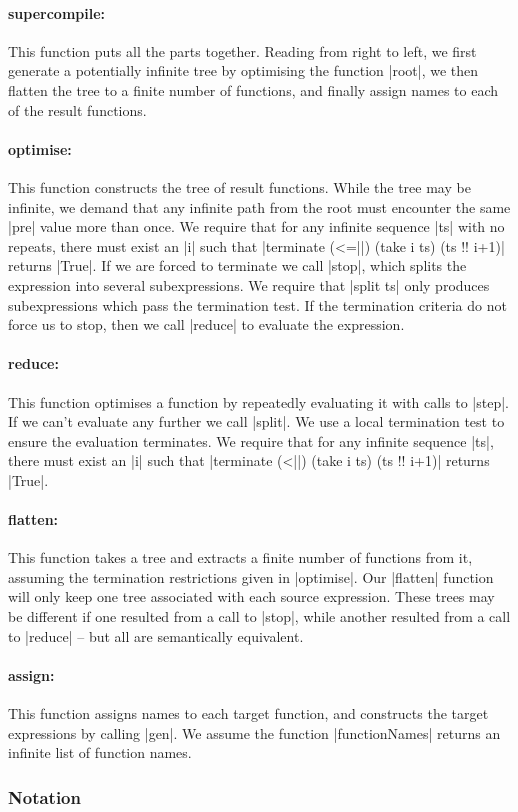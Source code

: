 \documentclass[draft]{sigplanconf}
\begin{document}
\newcommand{\function}[1]{\paragraph{\textsf{#1:}}\hspace{-3mm}}

\function{supercompile} This function puts all the parts together. Reading from right to left, we first generate a potentially infinite tree by optimising the function |root|, we then flatten the tree to a finite number of functions, and finally assign names to each of the result functions.

\function{optimise} This function constructs the tree of result functions. While the tree may be infinite, we demand that any infinite path from the root must encounter the same |pre| value more than once. We require that for any infinite sequence |ts| with no repeats, there must exist an |i| such that |terminate (<=||) (take i ts) (ts !! i+1)| returns |True|. If we are forced to terminate we call |stop|, which splits the expression into several subexpressions. We require that |split ts| only produces subexpressions which pass the termination test. If the termination criteria do not force us to stop, then we call |reduce| to evaluate the expression.

\function{reduce} This function optimises a function by repeatedly evaluating it with calls to |step|. If we can't evaluate any further we call |split|. We use a local termination test to ensure the evaluation terminates. We require that for any infinite sequence |ts|, there must exist an |i| such that |terminate (<||) (take i ts) (ts !! i+1)| returns |True|.

\function{flatten} This function takes a tree and extracts a finite number of functions from it, assuming the termination restrictions given in |optimise|. Our |flatten| function will only keep one tree associated with each source expression. These trees may be different if one resulted from a call to |stop|, while another resulted from a call to |reduce| -- but all are semantically equivalent.

\function{assign} This function assigns names to each target function, and constructs the target expressions by calling |gen|. We assume the function |functionNames| returns an infinite list of function names.

\subsubsection{Notation}
\label{sec:child_notation}
\end{document}

